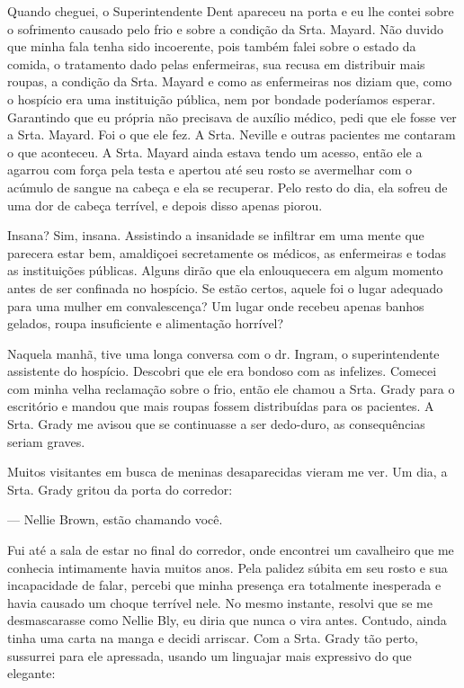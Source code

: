 Quando cheguei, o Superintendente Dent apareceu na porta e eu lhe contei
sobre o sofrimento causado pelo frio e sobre a condição da Srta. Mayard.
Não duvido que minha fala tenha sido incoerente, pois também falei sobre
o estado da comida, o tratamento dado pelas enfermeiras, sua recusa em
distribuir mais roupas, a condição da Srta. Mayard e como as enfermeiras
nos diziam que, como o hospício era uma instituição pública, nem por
bondade poderíamos esperar. Garantindo que eu própria não precisava de
auxílio médico, pedi que ele fosse ver a Srta. Mayard. Foi o que ele
fez. A Srta. Neville e outras pacientes me contaram o que aconteceu. A
Srta. Mayard ainda estava tendo um acesso, então ele a agarrou com força
pela testa e apertou até seu rosto se avermelhar com o acúmulo de sangue
na cabeça e ela se recuperar. Pelo resto do dia, ela sofreu de uma dor
de cabeça terrível, e depois disso apenas piorou.

Insana? Sim, insana. Assistindo a insanidade se infiltrar em uma mente
que parecera estar bem, amaldiçoei secretamente os médicos, as
enfermeiras e todas as instituições públicas. Alguns dirão que ela
enlouquecera em algum momento antes de ser confinada no hospício. Se
estão certos, aquele foi o lugar adequado para uma mulher em
convalescença? Um lugar onde recebeu apenas banhos gelados, roupa
insuficiente e alimentação horrível?

Naquela manhã, tive uma longa conversa com o dr. Ingram, o
superintendente assistente do hospício. Descobri que ele era bondoso com
as infelizes. Comecei com minha velha reclamação sobre o frio, então ele
chamou a Srta. Grady para o escritório e mandou que mais roupas fossem
distribuídas para os pacientes. A Srta. Grady me avisou que se
continuasse a ser dedo-duro, as consequências seriam graves.

Muitos visitantes em busca de meninas desaparecidas vieram me ver. Um
dia, a Srta. Grady gritou da porta do corredor:

--- Nellie Brown, estão chamando você.

Fui até a sala de estar no final do corredor, onde encontrei um
cavalheiro que me conhecia intimamente havia muitos anos. Pela palidez
súbita em seu rosto e sua incapacidade de falar, percebi que minha
presença era totalmente inesperada e havia causado um choque terrível
nele. No mesmo instante, resolvi que se me desmascarasse como Nellie
Bly, eu diria que nunca o vira antes. Contudo, ainda tinha uma carta na
manga e decidi arriscar. Com a Srta. Grady tão perto, sussurrei para ele
apressada, usando um linguajar mais expressivo do que elegante:

